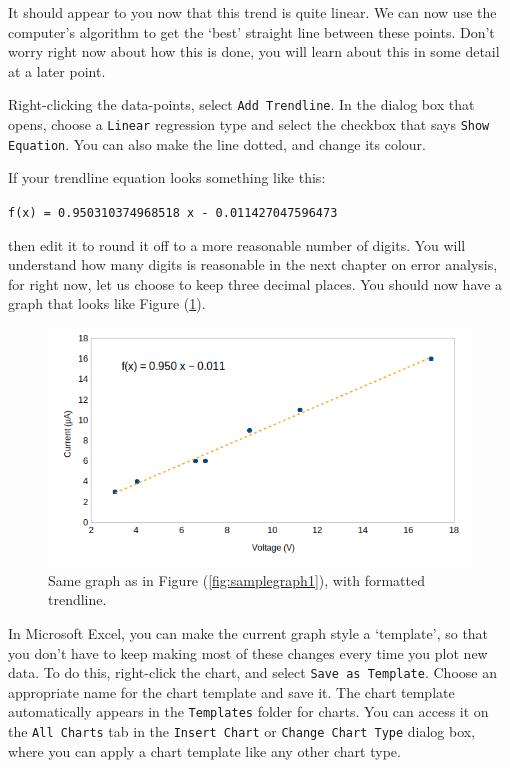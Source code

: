 It should appear to you now that this trend is quite linear. We can now use the computer's algorithm to get the `best' straight line between these points. Don't worry right now about how this is done, you will learn about this in some detail at a later point.

Right-clicking the data-points, select \texttt{Add Trendline}. In the dialog box that opens, choose a \texttt{Linear} regression type and select the checkbox that says \texttt{Show Equation}. You can also make the line dotted, and change its colour. 

If your trendline equation looks something like this:
\begin{center}
    \texttt{f(x) = 0.950310374968518 x - 0.011427047596473}
\end{center}

then edit it to round it off to a more reasonable number of digits. You will understand how many digits is reasonable in the next chapter on error analysis, for right now, let us choose to keep three decimal places. You should now have a graph that looks like Figure (\ref{fig:samplegraph3}).

\begin{figure}[!htb]
    \centering
    \includegraphics[scale=0.8]{figs/samplegraph3.png}
    \caption{Same graph as in Figure (\ref{fig:samplegraph1}), with formatted trendline.}
    \label{fig:samplegraph3}
\end{figure}

\begin{tip}
In Microsoft Excel, you can make the current graph style a `template', so that you don't have to keep making most of these changes every time you plot new data. To do this, right-click the chart, and select \texttt{Save as Template}. Choose an appropriate name for the chart template and save it. The chart template automatically appears in the \texttt{Templates} folder for charts. You can access it on the \texttt{All Charts} tab in the \texttt{Insert Chart} or \texttt{Change Chart Type} dialog box, where you can apply a chart template like any other chart type.
\end{tip}

